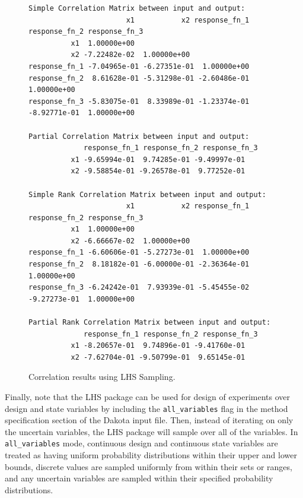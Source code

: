 \begin{figure}
\centering
\begin{bigbox}
\begin{small}
\begin{verbatim}
Simple Correlation Matrix between input and output:
                       x1           x2 response_fn_1 response_fn_2 response_fn_3
          x1  1.00000e+00
          x2 -7.22482e-02  1.00000e+00
response_fn_1 -7.04965e-01 -6.27351e-01  1.00000e+00
response_fn_2  8.61628e-01 -5.31298e-01 -2.60486e-01  1.00000e+00
response_fn_3 -5.83075e-01  8.33989e-01 -1.23374e-01 -8.92771e-01  1.00000e+00

Partial Correlation Matrix between input and output:
             response_fn_1 response_fn_2 response_fn_3
          x1 -9.65994e-01  9.74285e-01 -9.49997e-01
          x2 -9.58854e-01 -9.26578e-01  9.77252e-01

Simple Rank Correlation Matrix between input and output:
                       x1           x2 response_fn_1 response_fn_2 response_fn_3
          x1  1.00000e+00
          x2 -6.66667e-02  1.00000e+00
response_fn_1 -6.60606e-01 -5.27273e-01  1.00000e+00
response_fn_2  8.18182e-01 -6.00000e-01 -2.36364e-01  1.00000e+00
response_fn_3 -6.24242e-01  7.93939e-01 -5.45455e-02 -9.27273e-01  1.00000e+00

Partial Rank Correlation Matrix between input and output:
             response_fn_1 response_fn_2 response_fn_3
          x1 -8.20657e-01  9.74896e-01 -9.41760e-01
          x2 -7.62704e-01 -9.50799e-01  9.65145e-01
\end{verbatim}
\end{small}
\end{bigbox}
\caption{Correlation results using LHS Sampling.}
\label{uq:figure04}
\end{figure}

Finally, note that the LHS package can be used for design of
experiments over design and state variables by including the
\texttt{all\_variables} flag in the method specification section of
the Dakota input file. Then, instead of iterating on only the
uncertain variables, the LHS package will sample over all of the
variables. In \texttt{all\_variables} mode, continuous design and
continuous state variables are treated as having uniform probability
distributions within their upper and lower bounds, discrete values are
sampled uniformly from within their sets or ranges, and any uncertain
variables are sampled within their specified probability distributions.

